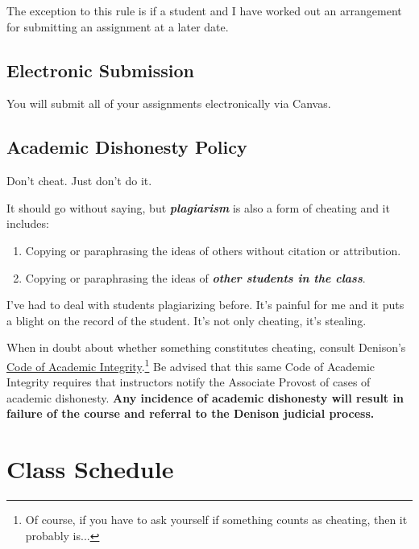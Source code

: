 \documentclass[11pt,]{article}
\providecommand{\tightlist}{%
  \setlength{\itemsep}{0pt}\setlength{\parskip}{0pt}}
\begin{document}
The exception to this rule is if a student and I have worked out an
arrangement for submitting an assignment at a later date.

\hypertarget{electronic-submission}{%
\subsection{Electronic Submission}\label{electronic-submission}}

You will submit all of your assignments electronically via Canvas.

\hypertarget{academic-dishonesty-policy}{%
\subsection{Academic Dishonesty
Policy}\label{academic-dishonesty-policy}}

Don't cheat. Just don't do it.

It should go without saying, but \textbf{\emph{plagiarism}} is also a
form of cheating and it includes:

\begin{enumerate}
\def\labelenumi{\arabic{enumi}.}
\tightlist
\item
  Copying or paraphrasing the ideas of others without citation or
  attribution.
\item
  Copying or paraphrasing the ideas of \textbf{\emph{other students in
  the class}}.
\end{enumerate}

I've had to deal with students plagiarizing before. It's painful for me
and it puts a blight on the record of the student. It's not only
cheating, it's stealing.

When in doubt about whether something constitutes cheating, consult
Denison's \href{https://denison.edu/academics/curriculum/integrity}{Code
of Academic
Integrity}.\footnote{Of course, if you have to ask yourself if something counts as cheating, then it probably is...}
Be advised that this same Code of Academic Integrity requires that
instructors notify the Associate Provost of cases of academic
dishonesty. \textbf{Any incidence of academic dishonesty will result in
failure of the course and referral to the Denison judicial process.}

\newpage

\hypertarget{class-schedule}{%
\section{Class Schedule}\label{class-schedule}}
\end{document}
